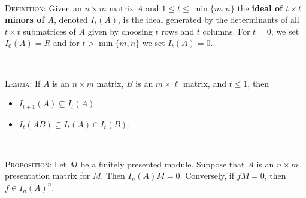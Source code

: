 \documentclass[12pt]{amsart}
\newcommand{\1}{\mathbbm{1}}
\begin{document}
\begin{framed}
\

\noindent \textsc{Definition:} Given an $n\times m$ matrix $A$ and $1\leq t \leq \min\{m,n\}$ the \textbf{ideal of $t\times t$ minors of $A$}, denoted $I_t(A)$, is the ideal generated by the determinants of all $t\times t$ submatrices of $A$ given by choosing $t$ rows and $t$ columns. For $t=0$, we set $I_0(A)=R$ and for $t>\min\{m,n\}$ we set $I_t(A)=0$.


\

\noindent \textsc{Lemma:} If $A$ is an $n\times m$ matrix, $B$ is an $m \times \ell$ matrix, and $t\leq 1$, then
\begin{itemize}
\item $I_{t+1}(A) \subseteq I_t(A)$
\item ${I_t(AB) \subseteq I_t(A) \cap I_t(B)}$.
\end{itemize}



\

\noindent \textsc{Proposition:} Let $M$ be a finitely presented module. Suppose that $A$ is an $n\times m$ presentation matrix for $M$. Then $I_n(A) M = 0$. Conversely, if $f M=0$, then $f\in I_n(A)^n$.

 
 \end{framed}
 
\end{document}
